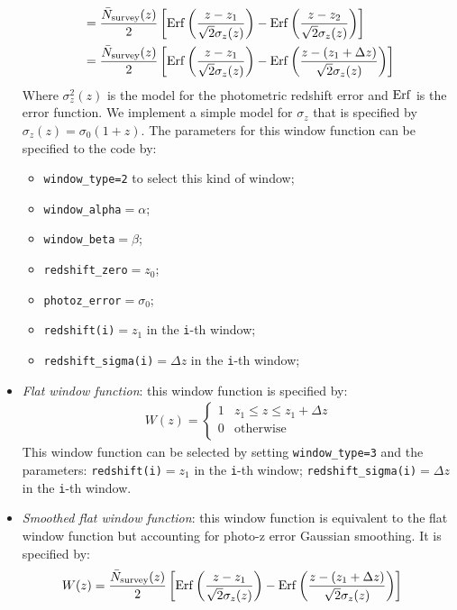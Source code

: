 \documentclass[prd,nofootinbib,showpacs]{revtex4}
\newcommand{\code}[1]{\lstinline|#1|}
\begin{document}
\begin{itemize}
\begin{align}
&= \frac{\bar{N}_{\rm survey}(z)}{2}\left[ {\rm Erf}\left(\frac{z-z_1}{\sqrt{2}\sigma_z(z)} \right) - {\rm Erf}\left(\frac{z-z_2}{\sqrt{2}\sigma_z(z)}  \right) \right]  \nonumber \\
&= \frac{\bar{N}_{\rm survey}(z)}{2}\left[ {\rm Erf}\left(\frac{z-z_1}{\sqrt{2}\sigma_z(z)} \right) - {\rm Erf}\left(\frac{z-(z_1+\Delta z)}{\sqrt{2}\sigma_z(z)}  \right) \right] 
\end{align}
%
Where $\sigma_z^2(z)$ is the model for the photometric redshift error and ${\rm Erf}$ is the error function.
We implement a simple model for $\sigma_z$ that is specified by $\sigma_z(z) = \sigma_0(1+z)$.
The parameters for this window function can be specified to the code by:
\begin{itemize}
\item \code{window_type=2} to select this kind of window;
\item \code{window_alpha}$=\alpha$;
\item \code{window_beta}$=\beta$;
\item \code{redshift_zero}$=z_0$;
\item \code{photoz_error}$=\sigma_0$;
\item \code{redshift(i)}$=z_1$ in the \code{i}-th window;
\item \code{redshift_sigma(i)}$=\Delta z$ in the \code{i}-th window;
\end{itemize}
\item {\it Flat window function}: this window function is specified by:
%
\begin{align} \label{Eq:FlatWindow}
W(z) = \left\{
\begin{array}{ll}
      1 & z_1 \leq z \leq z_1+\Delta z \\
      0 & \mbox{otherwise} \\
\end{array} 
\right.
\end{align}
%
This window function can be selected by setting \code{window_type=3} and the parameters: \code{redshift(i)}$=z_1$ in the \code{i}-th window; \code{redshift_sigma(i)}$=\Delta z$ in the \code{i}-th window. 
\item {\it Smoothed flat window function}: this window function is equivalent to the flat window function but accounting for photo-z error Gaussian smoothing. It is specified by:
%
\begin{align} \label{Eq:FlatSmoothWindow}
W(z) &= \frac{\bar{N}_{\rm survey}(z)}{2}\left[ {\rm Erf}\left(\frac{z-z_1}{\sqrt{2}\sigma_z(z)} \right) - {\rm Erf}\left(\frac{z-(z_1+\Delta z)}{\sqrt{2}\sigma_z(z)}  \right) \right] 

\end{align}
\end{itemize}
\end{document}
